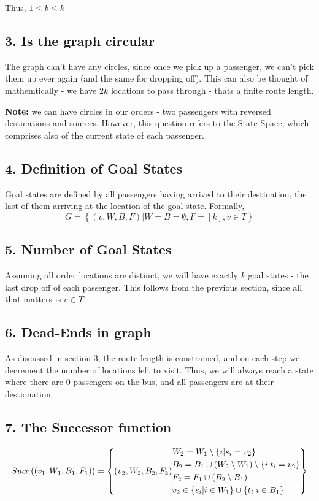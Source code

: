 \documentclass{article}
\begin{document}
Thus, $1 \leq b \leq k$

\subsection*{3. Is the graph circular}
The graph can't have any circles, since once we pick up a passenger, we can't pick them up ever again (and the same for dropping off). This can also be thought of mathemtically - we have $2k$ locations to pass through - thats a finite route length.

\textbf{Note:} we can have circles in our orders - two passengers with reversed destinations and sources. However, this question refers to the State Space, which comprises also of the current state of each passenger.

\subsection*{4. Definition of Goal States}
Goal states are defined by all passengers having arrived to their destination, the last of them arriving at the location of the goal state.
Formally,
$$
G = \left\{ (v, W, B, F) | W=B=\emptyset, F=[k], v\in T  \right\}
$$

\subsection*{5. Number of Goal States}
Assuming all order locations are distinct, we will have exactly $k$ goal states - the last drop off of each passenger.
This follows from the previous section, since all that matters is $v \in T$

\subsection*{6. Dead-Ends in graph}
As discussed in section 3, the route length is constrained, and on each step we decrement the number of locations left to visit.  Thus, we will always reach a state where there are $0$ passengers on the bus, and all passengers are at their destionation.

\subsection*{7. The \textbf{Successor} function}
\begin{equation}
Succ\left((v_1, W_1, B_1, F_1)\right) =  \left\{ 
	(v_2, W_2, B_2, F_2) \\  \vline \\ 
  \begin{aligned}
  & W_2 = W_1 \setminus \{i | s_i = v_2\} \\ 
  & B_2 = B_1 \cup (W_2 \setminus W_1) \setminus  \{i | t_i = v_2\} \\ 
  & F_2 = F_1 \cup (B_2 \setminus B_1) \\
  & v_2 \in \{s_i | i \in W_1 \} \cup \{t_i | i\in B_1\}
  \end{aligned}
\right\}
\end{equation}
\end{document}
